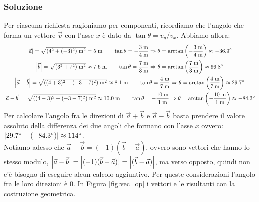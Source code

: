 \documentclass[12pt,a4paper]{book}
\begin{document}
\subsubsection*{Soluzione}
Per ciascuna richiesta ragioniamo per componenti, ricordiamo che l'angolo che forma un vettore $\vec{v}$ con l'asse $x$ è dato da $\tan\theta=v_y/v_x$. Abbiamo allora:
%
\begin{gather*}
\qty|\vec{a}|=\sqrt{(4^2+(-3)^2)\;\text{m}^2}=5\;\text{m} \qquad \tan\theta=-\frac{3\;\text{m}}{4\;\text{m}} \Rightarrow \theta=\arctan\qty(-\frac{3\;\text{m}}{4\;\text{m}})\approx-36.9\degree \\
\qty|\vec{b}|=\sqrt{(3^2+7^2)\;\text{m}^2}\approx 7.6\;\text{m} \qquad \tan\theta=\frac{7\;\text{m}}{3\;\text{m}} \Rightarrow \theta=\arctan\qty(\frac{7\;\text{m}}{3\;\text{m}})\approx66.8\degree \\
\qty|\vec{a}+\vec{b}|=\sqrt{((4+3)^2+(-3+7)^2)\;\text{m}^2}\approx 8.1\;\text{m} \qquad \tan\theta=\frac{4\;\text{m}}{7\;\text{m}} \Rightarrow \theta=\arctan\qty(\frac{4\;\text{m}}{7\;\text{m}})\approx 29.7\degree \\
\qty|\vec{a}-\vec{b}|=\sqrt{((4-3)^2+(-3-7)^2)\;\text{m}^2}\approx 10.0\;\text{m} \qquad \tan\theta=-\frac{10\;\text{m}}{1\;\text{m}} \Rightarrow \theta=\arctan\qty(-\frac{10\;\text{m}}{1\;\text{m}})\approx -84.3\degree 
\end{gather*}
%
Per calcolare l'angolo fra le direzioni di $\vec{a}+\vec{b}$ e $\vec{a}-\vec{b}$ basta prendere il valore assoluto della differenza dei due angoli che formano con l'asse $x$ ovvero: $\qty|29.7\degree-(-84.3\degree)|\approx 114\degree$.\\

Notiamo adesso che $\vec{a}-\vec{b}=(-1)(\vec{b}-\vec{a})$, ovvero sono vettori che hanno lo stesso modulo, $\qty|\vec{a}-\vec{b}|=\qty|(-1)(\vec{b}-\vec{a})|= \qty|(\vec{b}-\vec{a})|$, ma verso opposto, quindi non c'è bisogno di eseguire alcun calcolo aggiuntivo. Per queste considerazioni l'angolo fra le loro direzioni è 0. In Figura \ref{fig:vec_op} i vettori e le risultanti con la costruzione geometrica.
\end{document}
